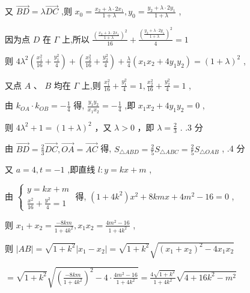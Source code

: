 \documentclass[10pt]{article}
\begin{document}
又 \(\overrightarrow{BD} = \lambda \overrightarrow{DC}\) ,则 \({x}_{0} = \frac{{x}_{2} + \lambda  \cdot  2{x}_{1}}{1 + \lambda },{y}_{0} = \frac{{y}_{2} + \lambda  \cdot  2{y}_{1}}{1 + \lambda }\) ,

因为点 \(D\) 在 \(\Gamma\) 上,所以 \(\frac{{\left( \frac{{x}_{2} + \lambda  \cdot  2{x}_{1}}{1 + \lambda }\right) }^{2}}{16} + \frac{{\left( \frac{{y}_{2} + \lambda  \cdot  2{y}_{1}}{1 + \lambda }\right) }^{2}}{4} = 1\)

则 \(4{\lambda }^{2}\left( {\frac{{x}_{1}^{2}}{16} + \frac{{y}_{1}^{2}}{4}}\right)  + \left( {\frac{{x}_{2}^{2}}{16} + \frac{{y}_{2}^{2}}{4}}\right)  + \frac{\lambda }{4}\left( {{x}_{1}{x}_{2} + 4{y}_{1}{y}_{2}}\right)  = {\left( 1 + \lambda \right) }^{2}\) ,

又点 \(A\text{ 、 }B\) 均在 \(\Gamma\) 上,则 \(\frac{{x}_{1}^{2}}{16} + \frac{{y}_{1}^{2}}{4} = 1,\frac{{x}_{2}^{2}}{16} + \frac{{y}_{2}^{2}}{4} = 1\) ,

由 \({k}_{OA} \cdot  {k}_{OB} =  - \frac{1}{4}\) 得, \(\frac{{y}_{1}{y}_{2}}{{x}_{1}{x}_{2}} =  - \frac{1}{4}\) ,即 \({x}_{1}{x}_{2} + 4{y}_{1}{y}_{2} = 0\) ,

则 \(4{\lambda }^{2} + 1 = {\left( 1 + \lambda \right) }^{2}\) ，又 \(\lambda  > 0\) ，即 \(\lambda  = \frac{2}{3}\) . .3 分

由 \(\overrightarrow{BD} = \frac{2}{3}\overrightarrow{DC},\overrightarrow{OA} = \overrightarrow{AC}\) 得, \({S}_{\bigtriangleup {ABD}} = \frac{2}{5}{S}_{\bigtriangleup {ABC}} = \frac{2}{5}{S}_{\bigtriangleup {OAB}}\) , .4 分

又 \(a = 4,t =  - 1\) ,即直线 \(l : y = {kx} + m\) ,

由 \(\left\{  \begin{matrix} y = {kx} + m \\  \frac{{x}^{2}}{16} + \frac{{y}^{2}}{4} = 1 \end{matrix}\right.\) 得, \(\left( {1 + 4{k}^{2}}\right) {x}^{2} + {8kmx} + 4{m}^{2} - {16} = 0\) ,

则 \({x}_{1} + {x}_{2} = \frac{-{8km}}{1 + 4{k}^{2}},{x}_{1}{x}_{2} = \frac{4{m}^{2} - {16}}{1 + 4{k}^{2}}\) ,

则 \(\left| {AB}\right|  = \sqrt{1 + {k}^{2}}\left| {{x}_{1} - {x}_{2}}\right|  = \sqrt{1 + {k}^{2}}\sqrt{{\left( {x}_{1} + {x}_{2}\right) }^{2} - 4{x}_{1}{x}_{2}}\)

\(= \sqrt{1 + {k}^{2}}\sqrt{{\left( \frac{-{8km}}{1 + 4{k}^{2}}\right) }^{2} - 4 \cdot  \frac{4{m}^{2} - {16}}{1 + 4{k}^{2}}} = \frac{4\sqrt{1 + {k}^{2}}}{1 + 4{k}^{2}}\sqrt{4 + {16}{k}^{2} - {m}^{2}}\)
\end{document}
